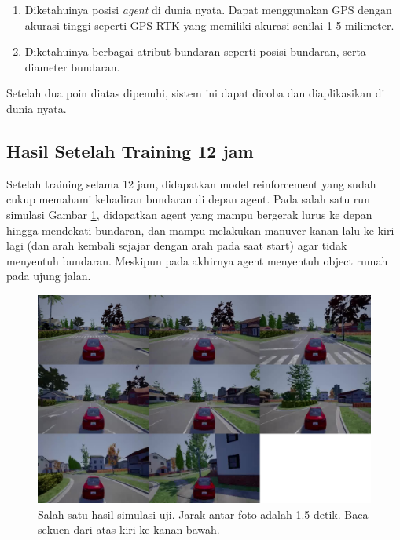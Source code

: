 \begin{enumerate}
	\item Diketahuinya posisi \textit{agent} di dunia nyata. Dapat menggunakan GPS dengan akurasi tinggi seperti GPS RTK yang memiliki akurasi senilai 1-5 milimeter.
	\item Diketahuinya berbagai atribut bundaran seperti posisi bundaran, serta diameter bundaran.
\end{enumerate}

Setelah dua poin diatas dipenuhi, sistem ini dapat dicoba dan diaplikasikan di dunia nyata.




\iffalse
\subsection{Hasil Setelah Training 12 jam}
\label{sec:hasil_training_12}
Setelah training selama 12 jam, didapatkan model reinforcement yang sudah cukup memahami kehadiran bundaran di depan agent. Pada salah satu run simulasi Gambar \ref{fig:uji0}, didapatkan agent yang mampu bergerak lurus ke depan hingga mendekati bundaran, dan mampu melakukan manuver kanan lalu ke kiri lagi (dan arah kembali sejajar dengan arah pada saat start) agar tidak menyentuh bundaran. Meskipun pada akhirnya agent menyentuh object rumah pada ujung jalan.

\begin{figure}[H] 
	\centering
	\includegraphics[width=1\linewidth]{images/uji0}
	\caption{Salah satu hasil simulasi uji. Jarak antar foto adalah 1.5 detik. Baca sekuen dari atas kiri ke kanan bawah.}
	\label{fig:uji0}
\end{figure}

